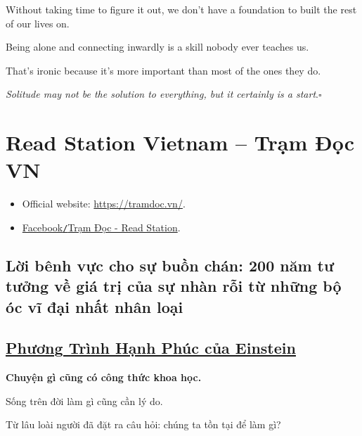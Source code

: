 \documentclass{article}
\begin{document}
Without taking time to figure it out, we don't have a foundation to built the rest of our lives on.

%
Being alone and connecting inwardly is a skill nobody ever teaches us.

That's ironic because it's more important than most of the ones they do.

%
\textit{Solitude may not be the solution to everything, but it certainly is a start}.\hfill$\square$








\section{Read Station Vietnam -- Trạm Đọc VN}

\begin{itemize}
	\item Official website: \url{https://tramdoc.vn/}.
	\item \href{https://www.facebook.com/tramdoc.vn}{Facebook{\tt/}Trạm Đọc - Read Station}.
\end{itemize}

\subsection{Lời bênh vực cho sự buồn chán: 200 năm tư tưởng về giá trị của sự nhàn rỗi từ những bộ óc vĩ đại nhất nhân loại}


\subsection{\href{http://tramdoc.vn/tin-tuc/phuong-trinh-hanh-phuc-cua-einstein-nzGgvW.html}{Phương Trình Hạnh Phúc của Einstein}}

\textbf{Chuyện gì cũng có công thức khoa học.}

%
Sống trên đời làm gì cũng cần lý do.

Từ lâu loài người đã đặt ra câu hỏi: chúng ta tồn tại để làm gì?
\end{document}
